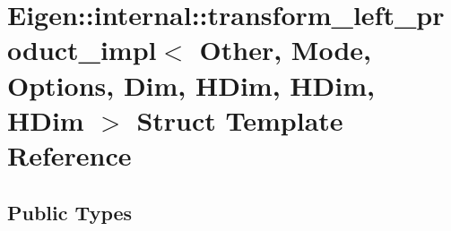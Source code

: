 \hypertarget{struct_eigen_1_1internal_1_1transform__left__product__impl_3_01_other_00_01_mode_00_01_options_0d7a5c2fda4fe7320ea55777493bf1a2a}{}\section{Eigen\+:\+:internal\+:\+:transform\+\_\+left\+\_\+product\+\_\+impl$<$ Other, Mode, Options, Dim, H\+Dim, H\+Dim, H\+Dim $>$ Struct Template Reference}
\label{struct_eigen_1_1internal_1_1transform__left__product__impl_3_01_other_00_01_mode_00_01_options_0d7a5c2fda4fe7320ea55777493bf1a2a}
\subsection*{Public Types}
